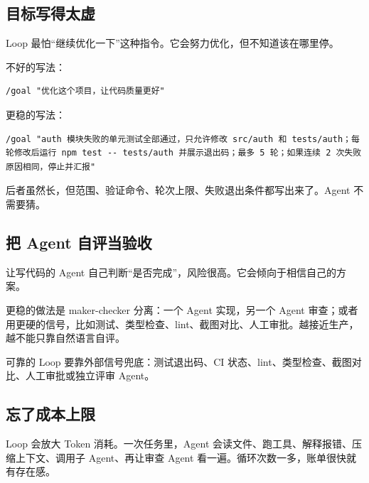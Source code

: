 \documentclass[10pt,a4paper]{ctexart}
\begin{document}
\subsection{目标写得太虚}


Loop 最怕“继续优化一下”这种指令。它会努力优化，但不知道该在哪里停。



不好的写法：



\begin{lstlisting}
/goal "优化这个项目，让代码质量更好"
\end{lstlisting}



更稳的写法：



\begin{lstlisting}
/goal "auth 模块失败的单元测试全部通过，只允许修改 src/auth 和 tests/auth；每轮修改后运行 npm test -- tests/auth 并展示退出码；最多 5 轮；如果连续 2 次失败原因相同，停止并汇报"
\end{lstlisting}



后者虽然长，但范围、验证命令、轮次上限、失败退出条件都写出来了。Agent 不需要猜。



\subsection{把 Agent 自评当验收}


让写代码的 Agent 自己判断“是否完成”，风险很高。它会倾向于相信自己的方案。



更稳的做法是 maker-checker 分离：一个 Agent 实现，另一个 Agent 审查；或者用更硬的信号，比如测试、类型检查、lint、截图对比、人工审批。越接近生产，越不能只靠自然语言自评。



可靠的 Loop 要靠外部信号兜底：测试退出码、CI 状态、lint、类型检查、截图对比、人工审批或独立评审 Agent。



\subsection{忘了成本上限}


Loop 会放大 Token 消耗。一次任务里，Agent 会读文件、跑工具、解释报错、压缩上下文、调用子 Agent、再让审查 Agent 看一遍。循环次数一多，账单很快就有存在感。
\end{document}
